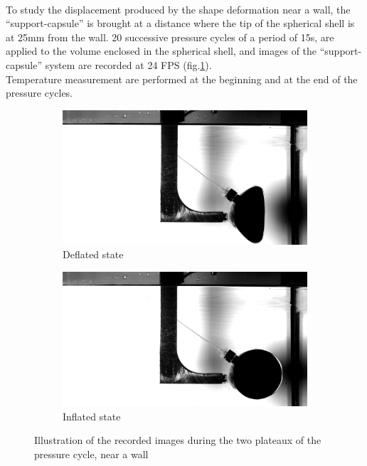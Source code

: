 \paragraph{}
To study the displacement produced by the shape deformation near a wall, the "`support-capsule"' is brought at a distance where the tip of the spherical shell is at 25mm from the wall. 20 successive pressure cycles of a period of 15s, are applied to the volume enclosed in the spherical shell, and images of the "`support-capsule"' system are recorded at 24 FPS (fig.\ref{fig:illustration_frictionless_rail_wall}).\\
Temperature measurement are performed at the beginning and at the end of the pressure cycles.
\begin{figure}[H]%
	\centering%
	 \begin{subfigure}[h]{0.48\textwidth}%
        \includegraphics[width=\linewidth]{figures/Chapter_1/cycles_pp_00220.png}%
        \caption{Deflated state}%
    \end{subfigure}%
    \begin{subfigure}[h]{0.48\textwidth}%
        \includegraphics[width=\linewidth]{figures/Chapter_1/cycles_pp_00001.png}%
        \caption{Inflated state}%
    \end{subfigure}%
		\caption{Illustration of the recorded images during the two plateaux of the pressure cycle, near a wall}
		\label{fig:illustration_frictionless_rail_wall}
\end{figure}
